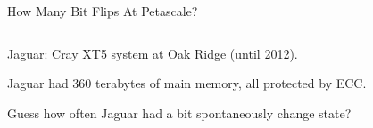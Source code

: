 






\begin{frame}{How Many Bit Flips At Petascale?}

\vspace{-2.8cm}
\begin{columns}
\hspace{-1cm}
\begin{column}{1.0\textwidth}
\bi
\item Jaguar: Cray XT5 system at Oak Ridge (until 2012).
%
\ssk
\item Jaguar had 360 terabytes of main memory, 
all protected by ECC.
%
\ssk
\item Guess how often Jaguar had a bit spontaneously change state?
\vspace{-0.3cm}
\ei
%
\end{column}
\end{columns}
%
\end{frame}





